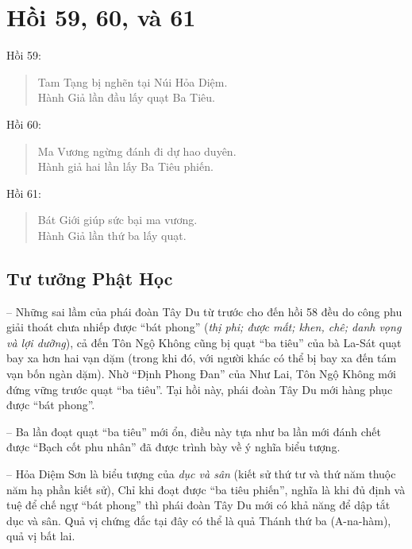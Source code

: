\chapter{Hồi 59, 60, và 61} %
\label{cha:hoi_59_60}

Hồi 59:

\begin{verse}
\begin{itshape}
Tam Tạng bị nghẽn tại Núi Hỏa Diệm.\\
Hành Giả lần đầu lấy quạt Ba Tiêu.
\end{itshape}
\end{verse}

Hồi 60:

\begin{verse}
\begin{itshape}
Ma Vương ngừng đánh đi dự hao duyên.\\
Hành giả hai lần lấy Ba Tiêu phiến.
\end{itshape}
\end{verse}

Hồi 61:

\begin{verse}
\begin{itshape}
Bát Giới giúp sức bại ma vương.\\
Hành Giả lần thứ ba lấy quạt.
\end{itshape}
\end{verse}

\section{Tư tưởng Phật Học} %
\label{sec:59_60_phat_hoc}

-- Những sai lầm của phái đoàn Tây Du từ trước cho đến hồi 58 đều do công phu giải thoát chưa nhiếp được ``bát phong'' (\emph{thị phi; được mất; khen, chê; danh vọng và lợi dưỡng}), cả đến Tôn Ngộ Không cũng bị quạt ``ba tiêu'' của bà La-Sát quạt bay xa hơn hai vạn dặm (trong khi đó, với người khác có thể bị bay xa đến tám vạn bốn ngàn dặm). Nhờ ``Định Phong Đan'' của Như Lai, Tôn Ngộ Không mới đứng vững trước quạt ``ba tiêu''. Tại hồi này, phái đoàn Tây Du mới hàng phục được ``bát phong''.

-- Ba lần đoạt quạt ``ba tiêu'' mới ổn, điều này tựa như ba lần mới đánh chết được ``Bạch cốt phu nhân'' đã được trình bày về ý nghĩa biểu tượng.

-- Hỏa Diệm Sơn là biểu tượng của \emph{dục và sân} (kiết sử thứ tư và thứ năm thuộc năm hạ phần kiết sử), Chỉ khi đoạt được ``ba tiêu phiến'', nghĩa là khi đủ định và tuệ để chế ngự ``bát phong'' thì phái đoàn Tây Du mới có khả năng để dập tắt dục và sân. Quả vị chứng đắc tại đây có thể là quả Thánh thứ ba (A-na-hàm), quả vị bất lai.

